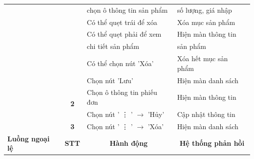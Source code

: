 \documentclass[../DoAn.tex]{subfiles}
\begin{document}
\begin{table}[H]
\begin{tabular}{|l|c|l|l|}
                                                 &                                                                    & chọn ô thông tin sản phẩm                 & số lượng, giá nhập                              \\ \cline{3-4}
                                                 &                                                                    & Có thể quẹt trái để xóa                   & Xóa mục sản phẩm                                \\ \cline{3-4}
                                                 &                                                                    & Có thể quẹt phải để xem                   & Hiện màn thông tin                              \\
                                                 &                                                                    & chi tiết sản phẩm                         & sản phẩm                                        \\ \cline{3-4}
                                                 &                                                                    & Có thể chọn nút 'Xóa'                     & Xóa hết mục sản phẩm                            \\ \cline{3-4}
                                                 &                                                                    & Chọn nút 'Lưu'                            & Hiện màn danh sách                              \\ \cline{2-4}
                                                 & \multirow{2}{*}{\textbf{2}}                                        & Chọn ô thông tin phiếu đơn                & Hiện màn thông tin                              \\ \cline{3-4}
                                                 &                                                                    & Chọn nút ' \vdots{} ' $\rightarrow$ 'Hủy' & Cập nhật thông tin                              \\ \cline{2-4}
                                                 & \multirow{1}{*}{\textbf{3}}                                        & Chọn nút ' \vdots{} ' $\rightarrow$ 'Xóa' & Hiện màn danh sách                              \\ \hline
        \multirow{3}{*}{\textbf{Luồng ngoại lệ}} & \multicolumn{1}{c|}{\textbf{STT}}                                  & \multicolumn{1}{c|}{\textbf{Hành động}}   & \multicolumn{1}{c|}{\textbf{Hệ thống phản hồi}} \\ \cline{2-4}

\end{tabular}
\end{table}
\end{document}
